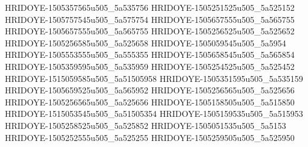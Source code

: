 HRIDOYE-1505357565u505_5a535756
HRIDOYE-1505251525u505_5a525152
HRIDOYE-1505757545u505_5a575754
HRIDOYE-1505657555u505_5a565755
HRIDOYE-1505657555u505_5a565755
HRIDOYE-1505256525u505_5a525652
HRIDOYE-1505256585u505_5a525658
HRIDOYE-1505059545u505_5a5954
HRIDOYE-1505553555u505_5a555355
HRIDOYE-1505658545u505_5a565854
HRIDOYE-1505359595u505_5a535959
HRIDOYE-1505254525u505_5a525452
HRIDOYE-1515059585u505_5a51505958
HRIDOYE-1505351595u505_5a535159
HRIDOYE-1505659525u505_5a565952
HRIDOYE-1505256565u505_5a525656
HRIDOYE-1505256565u505_5a525656
HRIDOYE-1505158505u505_5a515850
HRIDOYE-1515053545u505_5a51505354
HRIDOYE-1505159535u505_5a515953
HRIDOYE-1505258525u505_5a525852
HRIDOYE-1505051535u505_5a5153
HRIDOYE-1505252555u505_5a525255
HRIDOYE-1505259505u505_5a525950

